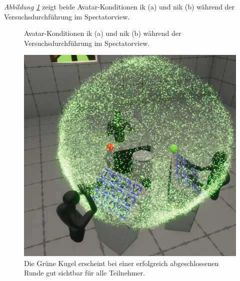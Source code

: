 \documentclass[a4paper,11pt]{article}%
\renewcommand{\\}{\vspace*{0.5\baselineskip} \newline}
\begin{document}
{\textit{Abbildung \ref{AvatareImEinsatz}} zeigt beide Avatar-Konditionen \ac{ik} (a) und \ac{nik} (b) während der Versuchsdurchführung im Spectatorview.
\newpage

\begin{figure}[h]
  \centering
  \qquad
  \caption[Die Avatare und der Spectatorview]{Avatar-Konditionen \ac{ik} (a) und \ac{nik} (b) während der Versuchsdurchführung im Spectatorview.}
  \label{AvatareImEinsatz}
\end{figure}

\begin{figure}[H]
		\begin{footnotesize}
		\centering
			\includegraphics[scale=0.2]{Abbildungen/RoundSuccsessful.JPG}	
			\caption[Der Abschluss einer Runde]{Die Grüne Kugel erscheint bei einer erfolgreich abgeschlossenen Runde gut sichtbar für alle Teilnehmer.}
			\label{RoundFinished}
		\end{footnotesize}
	\end{figure}
	
}
\end{document}
